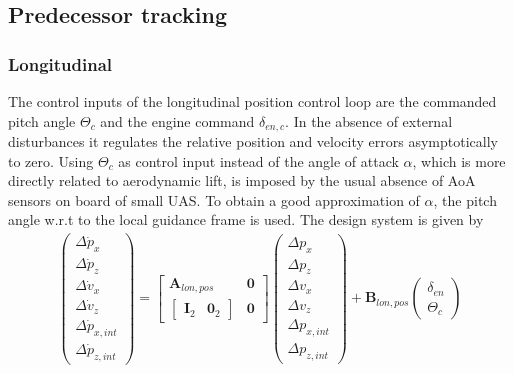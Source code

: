 \documentclass{ifacconf}
\newcommand{\mbf}[1]{\mathbf{#1}}
\providecommand{\mbf}[1]{\mathbf{#1}}
\begin{document}
\subsection{Predecessor tracking}
\subsubsection{Longitudinal}
The control inputs of the longitudinal position control loop are the commanded pitch angle $\Theta_c$ and the engine command $\delta_{en,c}$. In the absence of external disturbances it regulates the relative position and velocity errors asymptotically to zero. Using $\Theta_c$ as control input instead of the angle of attack $\alpha$, which is more directly related to aerodynamic lift, is imposed by the usual absence of AoA sensors on board of small UAS. To obtain a good approximation of $\alpha$, the pitch angle w.r.t to the local guidance frame is used. The design system is given by
%
\begin{align}
\begin{pmatrix}
\Delta \dot{p}_x \\
\Delta \dot{p}_z \\
\Delta \dot{v}_x \\
\Delta \dot{v}_z \\
\Delta \dot{p}_{x,int} \\
\Delta \dot{p}_{z,int} 
\end{pmatrix}
=
\begin{bmatrix}
\mbf{
A
}_{lon, pos} 
& 
\mbf{0} 
\\
\begin{bmatrix}
\mbf{I}_2 & \mbf{0}_{2}
\end{bmatrix}
& 
\mbf{0}
\end{bmatrix}
\begin{pmatrix}
\Delta {p}_x \\
\Delta {p}_z \\
\Delta {v}_x \\
\Delta {v}_z \\
\Delta {p}_{x,int} \\
\Delta {p}_{z,int} 
\end{pmatrix}
+
\mbf{
B
}_{lon, pos}
\begin{pmatrix}
\delta_{en} \\
\Theta_c
\end{pmatrix}
\end{align}
\end{document}
